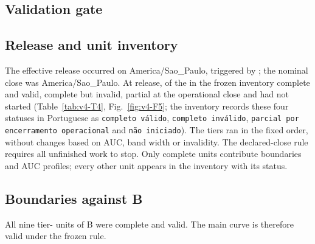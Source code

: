 \subsection{Validation gate}

\subsection{Release and unit inventory}
The effective release occurred on  America/Sao\_Paulo, triggered by ; the nominal close was  America/Sao\_Paulo. At release,  of the   in the frozen inventory  complete and valid,   complete but invalid,   partial at the operational close and  had not started (Table~\ref{tab:v4-T4}, Fig.~\ref{fig:v4-F5}; the inventory records these four statuses in Portuguese as \texttt{completo válido}, \texttt{completo inválido}, \texttt{parcial por encerramento operacional} and \texttt{não iniciado}). %
The tiers ran in the fixed order, without changes based on AUC, band width or invalidity. The declared-close rule requires all unfinished work to stop. %
Only complete units contribute boundaries and AUC profiles; every other unit appears in the inventory with its status. %

\subsection{Boundaries against B}
All nine tier- units of B were complete and valid. The main curve is therefore valid under the frozen rule. %

